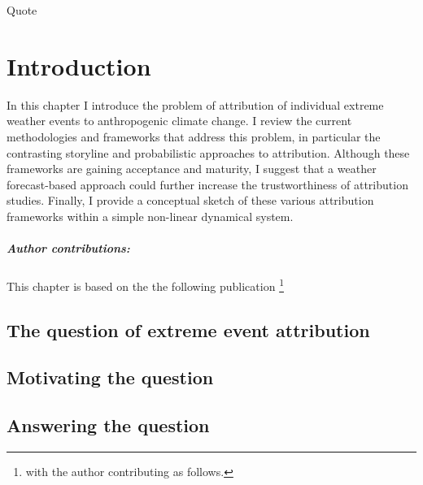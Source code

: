 \begin{savequote}[8cm]
    Quote
\end{savequote}
    
\chapter{\label{intro}Introduction} 

In this chapter I introduce the problem of attribution of individual extreme weather events to anthropogenic climate change. I review the current methodologies and frameworks that address this problem, in particular the contrasting storyline and probabilistic approaches to attribution. Although these frameworks are gaining acceptance and maturity, I suggest that a weather forecast-based approach could further increase the trustworthiness of attribution studies. Finally, I provide a conceptual sketch of these various attribution frameworks within a simple non-linear dynamical system.
\small\paragraph{Author contributions:} This chapter is based on the the following publication \footnote{with the author contributing as follows.} \par\vspace{1em}

\minitoc

\clearpage

\section{The question of extreme event attribution}

  \blindtext

\section{Motivating the question}

  \blindtext

\section{Answering the question}

